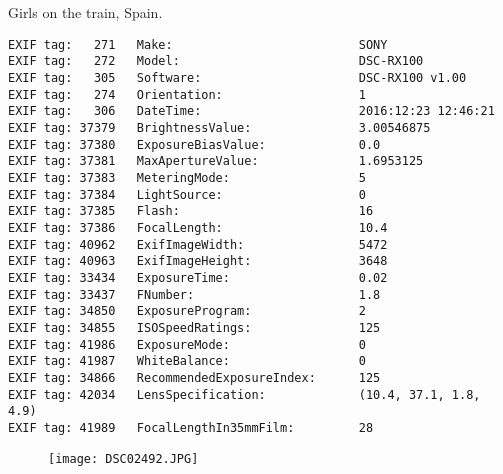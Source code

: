 \section{\protect{}}
\noindent Girls on the train, Spain.
\noindent
\begin{lstlisting}
EXIF tag:   271   Make:                          SONY
EXIF tag:   272   Model:                         DSC-RX100
EXIF tag:   305   Software:                      DSC-RX100 v1.00
EXIF tag:   274   Orientation:                   1
EXIF tag:   306   DateTime:                      2016:12:23 12:46:21
EXIF tag: 37379   BrightnessValue:               3.00546875
EXIF tag: 37380   ExposureBiasValue:             0.0
EXIF tag: 37381   MaxApertureValue:              1.6953125
EXIF tag: 37383   MeteringMode:                  5
EXIF tag: 37384   LightSource:                   0
EXIF tag: 37385   Flash:                         16
EXIF tag: 37386   FocalLength:                   10.4
EXIF tag: 40962   ExifImageWidth:                5472
EXIF tag: 40963   ExifImageHeight:               3648
EXIF tag: 33434   ExposureTime:                  0.02
EXIF tag: 33437   FNumber:                       1.8
EXIF tag: 34850   ExposureProgram:               2
EXIF tag: 34855   ISOSpeedRatings:               125
EXIF tag: 41986   ExposureMode:                  0
EXIF tag: 41987   WhiteBalance:                  0
EXIF tag: 34866   RecommendedExposureIndex:      125
EXIF tag: 42034   LensSpecification:             (10.4, 37.1, 1.8, 4.9)
EXIF tag: 41989   FocalLengthIn35mmFilm:         28

\end{lstlisting}
\clearpage
\begin{figure}
\raggedleft
\texttt{[image: DSC02492.JPG]}
\end{figure}


\clearpage

